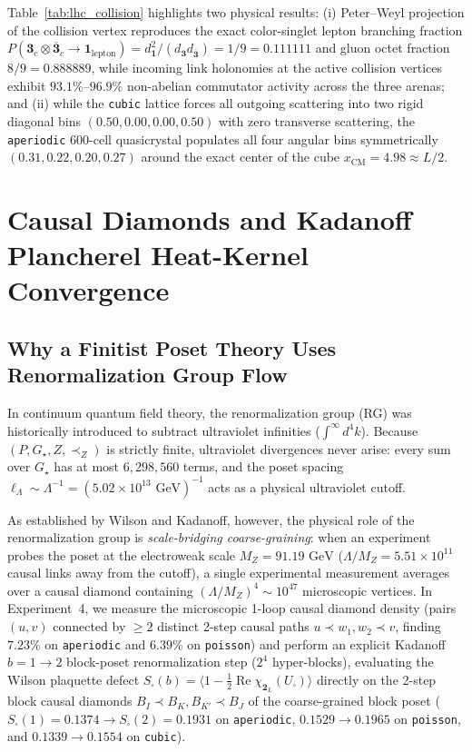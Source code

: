 \documentclass[11pt,a4paper]{article}
\theoremstyle{definition}
\theoremstyle{remark}
\newcommand{\Gstar}{G_\star}
\begin{document}
Table~\ref{tab:lhc_collision} highlights two physical results: (i) Peter--Weyl projection of the collision vertex reproduces the exact color-singlet lepton branching fraction $P(\mathbf{3}_c \otimes \overline{\mathbf{3}}_c \to \mathbf{1}_{\mathrm{lepton}}) = d_{\mathbf{1}}^2 / (d_{\mathbf{3}} d_{\overline{\mathbf{3}}}) = 1/9 = 0.111111$ and gluon octet fraction $8/9 = 0.888889$, while incoming link holonomies at the active collision vertices exhibit $93.1\%\text{--}96.9\%$ non-abelian commutator activity across the three arenas; and (ii) while the \texttt{cubic} lattice forces all outgoing scattering into two rigid diagonal bins $(0.50, 0.00, 0.00, 0.50)$ with zero transverse scattering, the \texttt{aperiodic} $600$-cell quasicrystal populates all four angular bins symmetrically $(0.31, 0.22, 0.20, 0.27)$ around the exact center of the cube $x_{\mathrm{CM}} = 4.98 \approx L/2$.

\section{Causal Diamonds and Kadanoff Plancherel Heat-Kernel Convergence}
\label{sec:plancherel_rg}

\subsection{Why a Finitist Poset Theory Uses Renormalization Group Flow}

In continuum quantum field theory, the renormalization group (RG) was historically introduced to subtract ultraviolet infinities ($\int^\infty d^4k$). Because $(P, \Gstar, Z, \prec_Z)$ is strictly finite, ultraviolet divergences never arise: every sum over $\Gstar$ has at most $6{,}298{,}560$ terms, and the poset spacing $\ell_\Lambda \sim \Lambda^{-1} = (5.02 \times 10^{13}\text{ GeV})^{-1}$ acts as a physical ultraviolet cutoff.

As established by Wilson and Kadanoff, however, the physical role of the renormalization group is \emph{scale-bridging coarse-graining}: when an experiment probes the poset at the electroweak scale $M_Z = 91.19\text{ GeV}$ ($\Lambda / M_Z = 5.51 \times 10^{11}$ causal links away from the cutoff), a single experimental measurement averages over a causal diamond containing $(\Lambda/M_Z)^4 \sim 10^{47}$ microscopic vertices. In Experiment~4, we measure the microscopic 1-loop causal diamond density (pairs $(u, v)$ connected by $\ge 2$ distinct 2-step causal paths $u \prec w_1, w_2 \prec v$, finding $7.23\%$ on \texttt{aperiodic} and $6.39\%$ on \texttt{poisson}) and perform an explicit Kadanoff $b = 1 \to 2$ block-poset renormalization step ($2^4$ hyper-blocks), evaluating the Wilson plaquette defect $S_\square(b) = \langle 1 - \frac{1}{2}\operatorname{Re}\chi_{\mathbf{2}_L}(U_\square)\rangle$ directly on the 2-step block causal diamonds $B_I \prec B_K, B_{K'} \prec B_J$ of the coarse-grained block poset ($S_\square(1) = 0.1374 \to S_\square(2) = 0.1931$ on \texttt{aperiodic}, $0.1529 \to 0.1965$ on \texttt{poisson}, and $0.1339 \to 0.1554$ on \texttt{cubic}).
\end{document}
